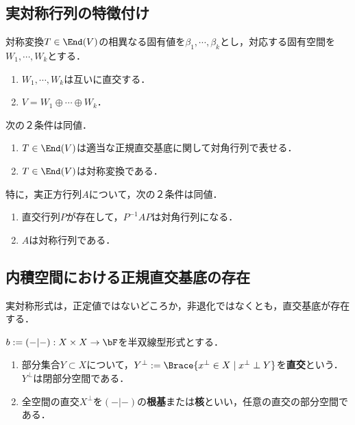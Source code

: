 \documentclass[uplatex, dvipdfmx]{jsreport}
\begin{document}
\subsection{実対称行列の特徴付け}

\begin{theorem}
    対称変換$T\in\End(V)$の相異なる固有値を$\beta_1,\cdots,\beta_k$とし，対応する固有空間を$W_1,\cdots,W_k$とする．
    \begin{enumerate}
        \item $W_1,\cdots,W_k$は互いに直交する．
        \item $V=W_1\oplus\cdots\oplus W_k$．
    \end{enumerate}
\end{theorem}

\begin{corollary}
    次の２条件は同値．
    \begin{enumerate}
        \item $T\in\End(V)$は適当な正規直交基底に関して対角行列で表せる．
        \item $T\in\End(V)$は対称変換である．
    \end{enumerate}
    特に，実正方行列$A$について，次の２条件は同値．
    \begin{enumerate}
        \item 直交行列$P$が存在して，$P^{-1}AP$は対角行列になる．
        \item $A$は対称行列である．
    \end{enumerate}
\end{corollary}

\subsection{内積空間における正規直交基底の存在}

\begin{tcolorbox}[colframe=ForestGreen, colback=ForestGreen!10!white,breakable,colbacktitle=ForestGreen!40!white,coltitle=black,fonttitle=\bfseries\sffamily,
title=]
    実対称形式は，正定値ではないどころか，非退化ではなくとも，直交基底が存在する．
\end{tcolorbox}

\begin{definition}[orthogonal]
    $b:=(-|-):X\times X\to\bF$を半双線型形式とする．
    \begin{enumerate}
        \item 部分集合$Y\subset X$について，$Y^\perp:=\Brace{x^\perp\in X\mid x^\perp\perp Y}$を\textbf{直交}という．$Y^\perp$は閉部分空間である．
        \item 全空間の直交$X^\perp$を$(-|-)$の\textbf{根基}または\textbf{核}といい，任意の直交の部分空間である．
    \end{enumerate}
\end{definition}
\end{document}

